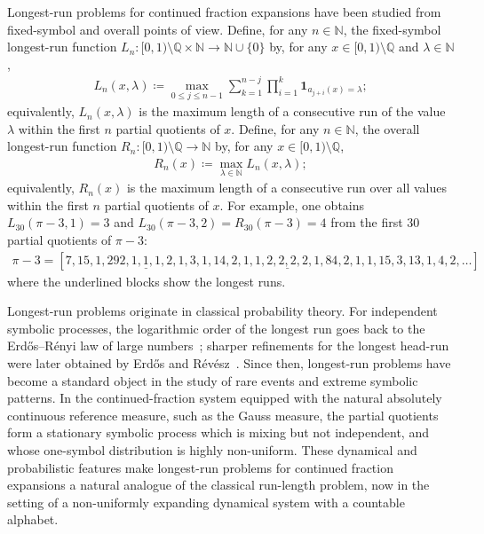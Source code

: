 \documentclass[12pt,reqno]{amsart}
\theoremstyle{definition}
\theoremstyle{plain}
\begin{document}
Longest-run problems for continued fraction expansions have been studied from fixed-symbol and overall points of view. Define, for any $n\in\mathbb{N}$, the fixed-symbol longest-run function $L_n:[0,1)\setminus\mathbb{Q}\times\mathbb{N}\to\mathbb{N}\cup\{0\}$ by, for any $x\in [0,1)\setminus\mathbb{Q}$ and $\lambda\in\mathbb{N}$,
\begin{align*}
    L_n(x,\lambda)
    \coloneqq\max_{0\leq j\leq n-1}\sum_{k=1}^{n-j}\prod_{i=1}^k\mathbf{1}_{a_{j+i}(x)=\lambda};
\end{align*}
equivalently, $L_n(x,\lambda)$ is the maximum length of a consecutive run of the value $\lambda$ within the first $n$ partial quotients of $x$. Define, for any $n\in\mathbb{N}$, the overall longest-run function $R_n:[0,1)\setminus\mathbb{Q}\to\mathbb{N}$ by, for any $x\in[0,1)\setminus\mathbb{Q}$,
\begin{align*}
    R_n(x)
    \coloneqq \max_{\lambda\in\mathbb{N}} L_n(x,\lambda);
\end{align*}
equivalently, $R_n(x)$ is the maximum length of a consecutive run over all values within the first $n$ partial quotients of $x$. For example, one obtains $L_{30}(\pi-3,1)=3$ and $L_{30}(\pi-3,2)=R_{30}(\pi-3)=4$ from the first 30 partial quotients of $\pi-3$:
\begin{align*}
    \pi-3=[7,15,1,292,
    \underline{1,1,1},
    2,1,3,1,14,2,1,1,
    \underline{2,2,2,2},
    1,84,2,1,1,15,3,13,1,4,2,\ldots]
\end{align*}
where the underlined blocks show the longest runs.

Longest-run problems originate in classical probability theory. For independent symbolic processes, the logarithmic order of the longest run goes back to the Erd\H{o}s--R\'enyi law of large numbers~\cite{ErdosRenyi1970}; sharper refinements for the longest head-run were later obtained by Erd\H{o}s and R\'ev\'esz~\cite{ErdosRevesz1975}. Since then, longest-run problems have become a standard object in the study of rare events and extreme symbolic patterns. In the continued-fraction system equipped with the natural absolutely continuous reference measure, such as the Gauss measure, the partial quotients form a stationary symbolic process which is mixing but not independent, and whose one-symbol distribution is highly non-uniform. These dynamical and probabilistic features make longest-run problems for continued fraction expansions a natural analogue of the classical run-length problem, now in the setting of a non-uniformly expanding dynamical system with a countable alphabet.
\end{document}
